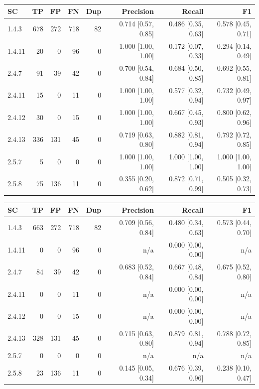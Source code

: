 \begin{tabular}{lrrrrrrr}
\hline
SC & TP & FP & FN & Dup & Precision & Recall & F1 \\
\hline
1.4.3 & 678 & 272 & 718 & 82 & 0.714 [0.57, 0.85] & 0.486 [0.35, 0.63] & 0.578 [0.45, 0.71] \\
1.4.11 & 20 & 0 & 96 & 0 & 1.000 [1.00, 1.00] & 0.172 [0.07, 0.33] & 0.294 [0.14, 0.49] \\
2.4.7 & 91 & 39 & 42 & 0 & 0.700 [0.54, 0.84] & 0.684 [0.50, 0.85] & 0.692 [0.55, 0.81] \\
2.4.11 & 15 & 0 & 11 & 0 & 1.000 [1.00, 1.00] & 0.577 [0.32, 0.94] & 0.732 [0.49, 0.97] \\
2.4.12 & 30 & 0 & 15 & 0 & 1.000 [1.00, 1.00] & 0.667 [0.45, 0.93] & 0.800 [0.62, 0.96] \\
2.4.13 & 336 & 131 & 45 & 0 & 0.719 [0.63, 0.80] & 0.882 [0.81, 0.94] & 0.792 [0.72, 0.85] \\
2.5.7 & 5 & 0 & 0 & 0 & 1.000 [1.00, 1.00] & 1.000 [1.00, 1.00] & 1.000 [1.00, 1.00] \\
2.5.8 & 75 & 136 & 11 & 0 & 0.355 [0.20, 0.62] & 0.872 [0.71, 0.99] & 0.505 [0.32, 0.73] \\
\hline
\end{tabular}

\begin{tabular}{lrrrrrrr}
\hline
SC & TP & FP & FN & Dup & Precision & Recall & F1 \\
\hline
1.4.3 & 663 & 272 & 718 & 82 & 0.709 [0.56, 0.84] & 0.480 [0.34, 0.63] & 0.573 [0.44, 0.70] \\
1.4.11 & 0 & 0 & 96 & 0 & n/a & 0.000 [0.00, 0.00] & n/a \\
2.4.7 & 84 & 39 & 42 & 0 & 0.683 [0.52, 0.84] & 0.667 [0.48, 0.84] & 0.675 [0.52, 0.80] \\
2.4.11 & 0 & 0 & 11 & 0 & n/a & 0.000 [0.00, 0.00] & n/a \\
2.4.12 & 0 & 0 & 15 & 0 & n/a & 0.000 [0.00, 0.00] & n/a \\
2.4.13 & 328 & 131 & 45 & 0 & 0.715 [0.63, 0.80] & 0.879 [0.81, 0.94] & 0.788 [0.72, 0.85] \\
2.5.7 & 0 & 0 & 0 & 0 & n/a & n/a & n/a \\
2.5.8 & 23 & 136 & 11 & 0 & 0.145 [0.05, 0.34] & 0.676 [0.39, 0.96] & 0.238 [0.10, 0.47] \\
\hline
\end{tabular}

